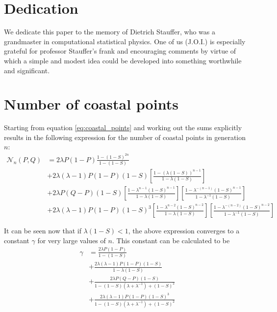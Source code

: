 \documentclass[amsmath,amssymb,amsfonts,aps,pre,preprint,superscriptaddress,bibnotes,showpacs,showkeys,longbibliography,nofootinbib]{revtex4-1}
\begin{document}
\section{Dedication}

We dedicate this paper to the memory of Dietrich Stauffer, who was a grandmaster in computational statistical physics. One of us (J.O.I.) is especially grateful for professor Stauffer's frank and encouraging comments by virtue of which  a simple and modest idea could be developed into something worthwhile and significant. 

\newpage 
\appendix
\section{Number of coastal points}\label{app:1}
Starting from equation \eqref{eq:coastal_points} and working out the sums explicitly results in the following expression for the number of coastal points in generation $n$:
\begin{equation}
    \label{eq:coastal_points_worked}
    \begin{split}
        \mathcal{N}_n(P,Q) &= 2 \lambda P(1-P)\frac{1-(1-S)^{2n}}{1-(1-S)}\\
        &+ 2\lambda(\lambda-1)P(1-P)(1-S) \left[\frac{1-\left(\lambda (1-S)\right)^{n-1}}{1-\lambda(1-S)}\right]\\
        &+ 2\lambda P(Q-P) (1-S) \left[\frac{1-\lambda^{n-1} (1-S)^{n-1}}{1-\lambda(1-S)}\right]\left[\frac{1-\lambda^{-(n-1)} (1-S)^{n-1}}{1-\lambda^{-1}(1-S)}\right]\\
        &+ 2\lambda(\lambda-1) P(1-P)(1-S)^3 \left[\frac{1-\lambda^{n-2} (1-S)^{n-2}}{1-\lambda(1-S)}\right]\left[\frac{1-\lambda^{-(n-2)} (1-S)^{n-2}}{1-\lambda^{-1}(1-S)}\right]
    \end{split}
\end{equation}

It can be seen now that if $\lambda (1-S)<1$, the above expression converges to a constant $\gamma$ for very large values of $n$. This constant can be calculated to be
\begin{equation}
    \label{eq:gamma}
    \begin{split}
        \gamma &= \frac{2 \lambda P(1-P)}{1-(1-S)}\\
        &+ \frac{2\lambda(\lambda-1)P(1-P)(1-S)}{1-\lambda(1-S)}\\
        &+ \frac{2\lambda P(Q-P) (1-S) }{1-(1-S)(\lambda+\lambda^{-1}) +(1-S)^2}\\
        &+ \frac{2\lambda(\lambda-1)P(1-P) (1-S)^3 }{1-(1-S)(\lambda+\lambda^{-1}) +(1-S)^2}\\
    \end{split}
\end{equation}
\end{document}
